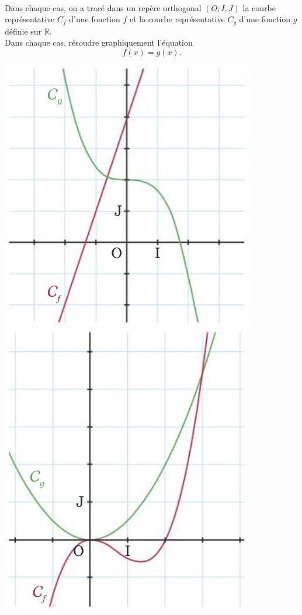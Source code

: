 \documentclass[11pt]{article}
\begin{document}
\begin{exo}~\\[-5mm]
\begin{minipage}{.4\textwidth}
  Dans chaque cas, on a tracé dans un repère orthogonal $(O; I, J)$ la courbe
  représentative $C_f$ d'une fonction $f$ et la courbe représentative $C_g$
  d'une fonction $g$ définie sur $\mathbb{R}$.\\
  Dans chaque cas, résoudre graphiquement l'équation
  \[
    f(x)=g(x).
  \]
\end{minipage}
\begin{minipage}{.6\textwidth}
  \begin{center}
\includegraphics[scale=.3]{courbes2.png}
\includegraphics[scale=.3]{courbes1.png}
  \end{center}
\end{minipage}
\end{exo}
\end{document}
